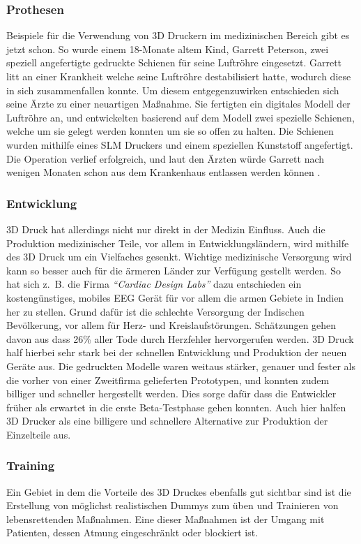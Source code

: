 \subsubsection{Prothesen}
Beispiele für die Verwendung von 3D Druckern im medizinischen Bereich gibt es jetzt schon. So wurde einem 18-Monate altem Kind, Garrett Peterson, zwei speziell angefertigte gedruckte Schienen für seine Luftröhre eingesetzt. Garrett litt an einer Krankheit welche seine Luftröhre destabilisiert hatte, wodurch diese in sich zusammenfallen konnte. Um diesem entgegenzuwirken entschieden sich seine Ärzte zu einer neuartigen Maßnahme. Sie fertigten ein digitales Modell der Luftröhre an, und entwickelten basierend auf dem Modell zwei spezielle Schienen, welche um sie gelegt werden konnten um sie so offen zu halten. Die Schienen wurden mithilfe eines SLM Druckers und einem speziellen Kunststoff angefertigt. Die Operation verlief erfolgreich, und laut den Ärzten würde Garrett nach wenigen Monaten schon aus dem Krankenhaus entlassen werden können \parencite{BABY}.

\subsubsection{Entwicklung}
3D Druck hat allerdings nicht nur direkt in der Medizin Einfluss. Auch die Produktion medizinischer Teile, vor allem in Entwicklungsländern, wird mithilfe des 3D Druck um ein Vielfaches gesenkt. Wichtige medizinische Versorgung wird kann so besser auch für die ärmeren Länder zur Verfügung gestellt werden. So hat sich z.~B. die Firma \emph{\textquotedblleft Cardiac Design Labs\textquotedblright} dazu entschieden ein kostengünstiges, mobiles EEG Gerät für vor allem die armen Gebiete in Indien her zu stellen. Grund dafür ist die schlechte Versorgung der Indischen Bevölkerung, vor allem für Herz- und Kreislaufstörungen. Schätzungen gehen davon aus dass 26\% aller Tode durch Herzfehler hervorgerufen werden. 3D Druck half hierbei sehr stark bei der schnellen Entwicklung und Produktion der neuen Geräte aus. Die gedruckten Modelle waren weitaus stärker, genauer und fester als die vorher von einer Zweitfirma gelieferten Prototypen, und konnten zudem billiger und schneller hergestellt werden. Dies sorge dafür dass die Entwickler früher als erwartet in die erste Beta-Testphase gehen konnten. Auch hier halfen 3D Drucker als eine billigere und schnellere Alternative zur Produktion der Einzelteile aus. \parencite{MIRCAM_STUDY}

\subsubsection{Training}
Ein Gebiet in dem die Vorteile des 3D Druckes ebenfalls gut sichtbar sind ist die Erstellung von möglichst realistischen Dummys zum üben und Trainieren von lebensrettenden Maßnahmen. Eine dieser Maßnahmen ist der Umgang mit Patienten, dessen Atmung eingeschränkt oder blockiert ist. 


